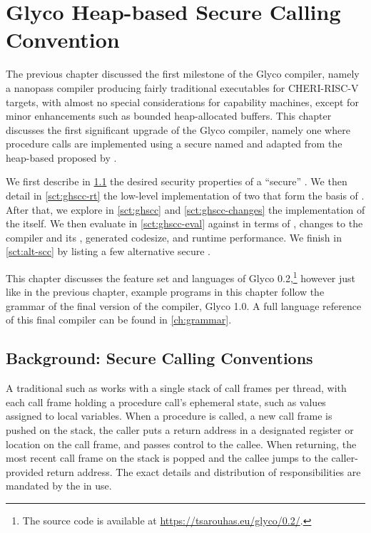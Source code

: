 \documentclass[main.tex]{subfiles}
\begin{document}
\onlyinsubfile{\mainmatter{}}

\chapter{Glyco Heap-based Secure Calling Convention}
The previous chapter discussed the first milestone of the Glyco compiler, namely a nanopass compiler producing fairly traditional executables for CHERI-RISC-V targets, with almost no special considerations for capability machines, except for minor enhancements such as bounded heap-allocated buffers. This chapter discusses the first significant upgrade of the Glyco compiler, namely one where procedure calls are implemented using a secure  named \textbf{} and adapted from the heap-based  proposed by \cite{cerise}.

We first describe in \cref{sct:scc} the desired security properties of a \enquote{secure} . We then detail in \cref{sct:ghscc-rt} the low-level implementation of two  that form the basis of . After that, we explore in \cref{sct:ghscc} and \cref{sct:ghscc-changes} the implementation of the  itself. We then evaluate in \cref{sct:ghscc-eval}  against  in terms of , changes to the compiler and its , generated codesize, and runtime performance. We finish in \cref{sct:alt-scc} by listing a few alternative secure .

This chapter discusses the feature set and languages of Glyco 0.2,\footnote{The source code is available at \url{https://tsarouhas.eu/glyco/0.2/}.} however just like in the previous chapter, example programs in this chapter follow the grammar of the final version of the compiler, Glyco 1.0. A full language reference of this final compiler can be found in \cref{ch:grammar}.

\section{Background: Secure Calling Conventions} \label{sct:scc}
A traditional  such as  works with a single stack of call frames per thread, with each call frame holding a procedure call's ephemeral state, such as values assigned to local variables. When a procedure is called, a new call frame is pushed on the stack, the caller puts a return address in a designated register or location on the call frame, and passes control to the callee. When returning, the most recent call frame on the stack is popped and the callee jumps to the caller-provided return address. The exact details and distribution of responsibilities are mandated by the  in use.
\end{document}
